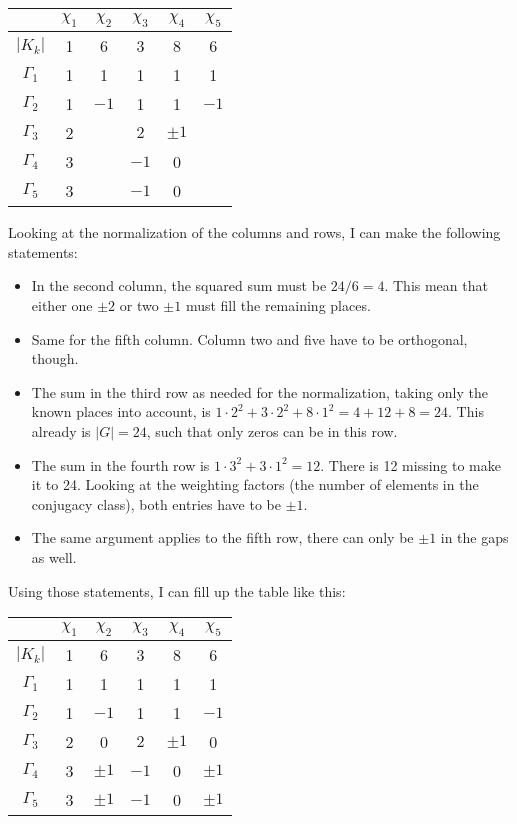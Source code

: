 \documentclass[11pt, english, fleqn, DIV=15, headinclude, BCOR=1cm]{scrartcl}
\begin{document}
\begin{tabular}{c|ccccc}
    & $\chi_1$ & $\chi_2$ & $\chi_3$ & $\chi_4$ & $\chi_5$ \\
    \midrule
    $|K_k|$ & 1 & 6 & 3 & 8 & 6 \\
    \midrule
    $\Gamma_1$ & 1 & 1 & 1 & 1 & 1 \\
    $\Gamma_2$ & 1 & $-1$ & 1 & 1 & $-1$ \\
    $\Gamma_3$ & 2 & & $2$ & $\pm 1$ & \\
    $\Gamma_4$ & 3 & & $-1$ & 0 & \\
    $\Gamma_5$ & 3 & & $-1$ & 0 & \\
\end{tabular}

Looking at the normalization of the columns and rows, I can make the following
statements:
\begin{itemize}
    \item
        In the second column, the squared sum must be $24/6=4$. This mean
        that either one $\pm 2$ or two $\pm 1$ must fill the remaining places.
    \item
        Same for the fifth column. Column two and five have to be orthogonal,
        though.
    \item
        The sum in the third row as needed for the normalization,
        taking only the known places into account, is $1\cdot2^2 + 3\cdot2^2 +
        8\cdot1^2 = 4 + 12 + 8 = 24$. This already is $|G| = 24$, such that
        only zeros can be in this row.
    \item
        The sum in the fourth row is $1\cdot3^2 + 3\cdot1^2 = 12$. There is 12
        missing to make it to 24. Looking at the weighting factors (the number
        of elements in the conjugacy class), both entries have to be $\pm1$.
    \item
        The same argument applies to the fifth row, there can only be $\pm 1$
        in the gaps as well.
\end{itemize}
Using those statements, I can fill up the table like this:

\begin{tabular}{c|ccccc}
    & $\chi_1$ & $\chi_2$ & $\chi_3$ & $\chi_4$ & $\chi_5$ \\
    \midrule
    $|K_k|$ & 1 & 6 & 3 & 8 & 6 \\
    \midrule
    $\Gamma_1$ & 1 & 1 & 1 & 1 & 1 \\
    $\Gamma_2$ & 1 & $-1$ & 1 & 1 & $-1$ \\
    $\Gamma_3$ & 2 & 0 & $2$ & $\pm 1$ & 0 \\
    $\Gamma_4$ & 3 & $\pm 1$ & $-1$ & 0 & $\pm 1$ \\
    $\Gamma_5$ & 3 & $\pm 1$ & $-1$ & 0 & $\pm 1$ \\
\end{tabular}
\end{document}
